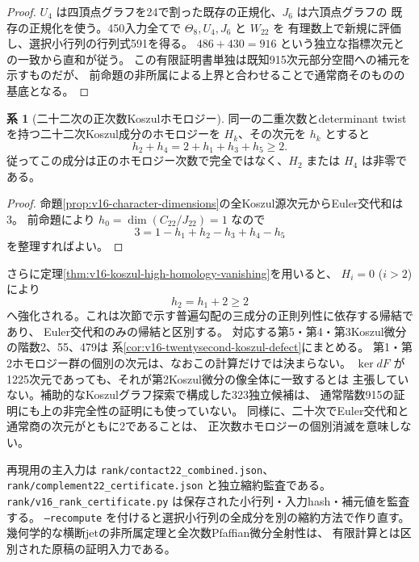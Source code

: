 \documentclass[a4paper,11pt]{ltjsarticle}
\theoremstyle{definition}
\newtheorem{corollary}[theorem]{系}
\begin{document}
\begin{proof}
$U_4$ は四頂点グラフを24で割った既存の正規化、$J_6$ は六頂点グラフの
既存の正規化を使う。450入力全てで $\Theta_8,U_4,J_6$ と $W_{22}$ を
有理数上で新規に評価し、選択小行列の行列式591を得る。
$486+430=916$ という独立な指標次元との一致から直和が従う。
この有限証明書単独は既知915次元部分空間への補元を示すものだが、
前命題の非所属による上界と合わせることで通常商そのものの基底となる。
\end{proof}

\begin{corollary}[二十二次の正次数Koszulホモロジー]
\label{cor:v16-positive-koszul-homology}
同一の二重次数とdeterminant twistを持つ二十二次Koszul成分のホモロジーを
$H_k$、その次元を $h_k$ とすると
\[
 h_2+h_4=2+h_1+h_3+h_5\geq2.
\]
従ってこの成分は正のホモロジー次数で完全ではなく、$H_2$ または $H_4$ は非零である。
\end{corollary}

\begin{proof}
命題\ref{prop:v16-character-dimensions}の全Koszul源次元からEuler交代和は3。
前命題により $h_0=\dim(C_{22}/J_{22})=1$ なので
\[
 3=1-h_1+h_2-h_3+h_4-h_5
\]
を整理すればよい。
\end{proof}

さらに定理\ref{thm:v16-koszul-high-homology-vanishing}を用いると、
$H_i=0$ ($i>2$) により
\[
 h_2=h_1+2\geq2
\]
へ強化される。これは次節で示す普遍勾配の三成分の正則列性に依存する帰結であり、
Euler交代和のみの帰結と区別する。
対応する第5・第4・第3Koszul微分の階数2、55、479は
系\ref{cor:v16-twentysecond-koszul-defect}にまとめる。
第1・第2ホモロジー群の個別の次元は、なおこの計算だけでは決まらない。
$\ker dF$ が1225次元であっても、それが第2Koszul微分の像全体に一致するとは
主張していない。補助的なKoszulグラフ探索で構成した323独立候補は、
通常階数915の証明にも上の非完全性の証明にも使っていない。
同様に、二十次でEuler交代和と通常商の次元がともに2であることは、
正次数ホモロジーの個別消滅を意味しない。

再現用の主入力は \texttt{rank/contact22\_combined.json}、
\texttt{rank/complement22\_certificate.json} と独立縮約監査である。
\texttt{rank/v16\_rank\_certificate.py} は保存された小行列・入力hash・補元値を監査する。
\texttt{--recompute} を付けると選択小行列の全成分を別の縮約方法で作り直す。
幾何学的な横断jetの非所属定理と全次数Pfaffian微分全射性は、
有限計算とは区別された原稿の証明入力である。



\end{document}
